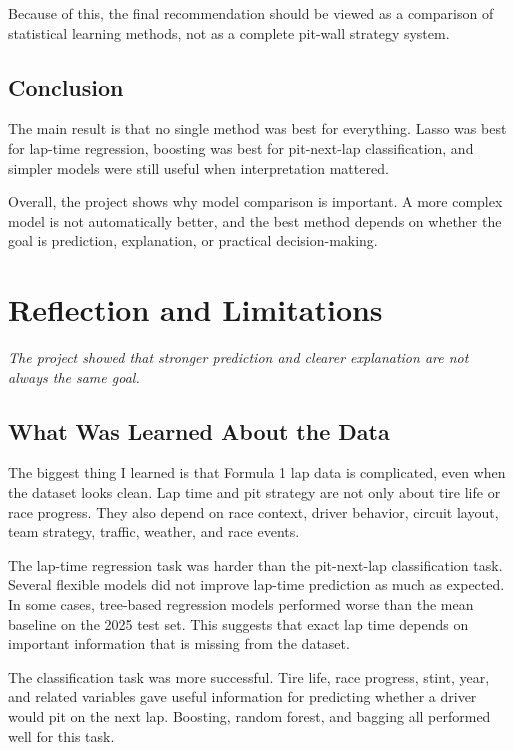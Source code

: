 \documentclass[11pt,oneside,openany]{book}
\newcommand{\chapterquote}[1]{%
\begin{center}
\small\textit{#1}
\end{center}
\vspace{-0.5em}
}
\begin{document}
Because of this, the final recommendation should be viewed as a comparison of statistical learning methods, not as a complete pit-wall strategy system.

\section{Conclusion}

The main result is that no single method was best for everything. Lasso was best for lap-time regression, boosting was best for pit-next-lap classification, and simpler models were still useful when interpretation mattered.

Overall, the project shows why model comparison is important. A more complex model is not automatically better, and the best method depends on whether the goal is prediction, explanation, or practical decision-making.


\chapter{Reflection and Limitations}
\chapterquote{The project showed that stronger prediction and clearer explanation are not always the same goal.}

\section{What Was Learned About the Data}

The biggest thing I learned is that Formula 1 lap data is complicated, even when the dataset looks clean. Lap time and pit strategy are not only about tire life or race progress. They also depend on race context, driver behavior, circuit layout, team strategy, traffic, weather, and race events.

The lap-time regression task was harder than the pit-next-lap classification task. Several flexible models did not improve lap-time prediction as much as expected. In some cases, tree-based regression models performed worse than the mean baseline on the 2025 test set. This suggests that exact lap time depends on important information that is missing from the dataset.

The classification task was more successful. Tire life, race progress, stint, year, and related variables gave useful information for predicting whether a driver would pit on the next lap. Boosting, random forest, and bagging all performed well for this task.
\end{document}
